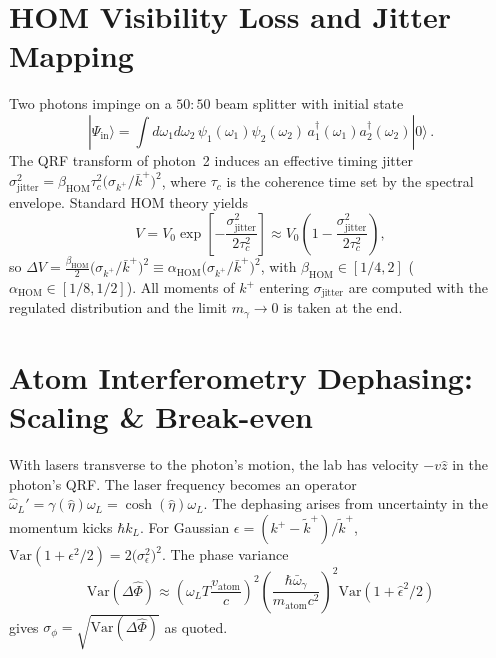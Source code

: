 \documentclass[aps,11pt]{article}
\providecommand{\ket}[1]{|#1\rangle}
\newcommand{\Var}{\mathrm{Var}}
\newcommand{\kplus}{k^{+}}
\newcommand{\kbar}{\bar{k}^{+}}
\newcommand{\ktil}{\tilde{k}^{+}}
\newcommand{\alphahom}{\alpha_{\text{HOM}}}
\newcommand{\betahom}{\beta_{\text{HOM}}}
\begin{document}
\section{HOM Visibility Loss and Jitter Mapping}\label{app:B}
Two photons impinge on a \(50{:}50\) beam splitter with initial state
\begin{equation}
\ket{\Psi_{\mathrm{in}}}=\int d\omega_1 d\omega_2\, \psi_1(\omega_1)\psi_2(\omega_2)\,
a_1^\dagger(\omega_1)a_2^\dagger(\omega_2)\ket{0}\,.
\end{equation}
The QRF transform of photon~2 induces an effective timing jitter \(\sigma_{\mathrm{jitter}}^{2}=\betahom \tau_c^{2}\big(\sigma_{\kplus}/\kbar\big)^{2}\), where \(\tau_c\) is the coherence time set by the spectral envelope. Standard HOM theory yields
\begin{equation}
V=V_0 \exp\!\left[-\frac{\sigma_{\mathrm{jitter}}^{2}}{2\tau_c^{2}}\right]\approx
V_0\!\left(1-\frac{\sigma_{\mathrm{jitter}}^{2}}{2\tau_c^{2}}\right),
\end{equation}
so \(\Delta V=\frac{\betahom}{2}\big(\sigma_{\kplus}/\kbar\big)^{2}\equiv \alphahom\big(\sigma_{\kplus}/\kbar\big)^{2}\), with \(\betahom\in[1/4,2]\) (\(\alphahom\in[1/8,1/2]\)). All moments of \(\kplus\) entering \(\sigma_{\mathrm{jitter}}\) are computed with the regulated distribution and the limit \(m_\gamma\to0\) is taken at the end.

\section{Atom Interferometry Dephasing: Scaling \& Break-even}\label{app:C}
With lasers transverse to the photon's motion, the lab has velocity \(-v\hat{z}\) in the photon's QRF. The laser frequency becomes an operator \(\hat\omega_L'=\gamma(\hat\eta)\omega_L=\cosh(\hat\eta)\omega_L\). The dephasing arises from uncertainty in the momentum kicks \(\hbar k_L\). For Gaussian \(\epsilon=(\kplus-\ktil)/\ktil\), \(\Var(1+\epsilon^2/2)=2\big(\sigma_{\epsilon}^{2}\big)^{2}\). The phase variance
\begin{equation}
\Var(\Delta\hat\Phi)\approx
\left(\omega_LT\frac{v_{\mathrm{atom}}}{c}\right)^{2}
\left(\frac{\hbar\bar\omega_\gamma}{m_{\mathrm{atom}}c^{2}}\right)^{2}\Var(1+\hat\epsilon^{2}/2)
\end{equation}
gives \(\sigma_\phi=\sqrt{\Var(\Delta\hat\Phi)}\) as quoted.
\end{document}
